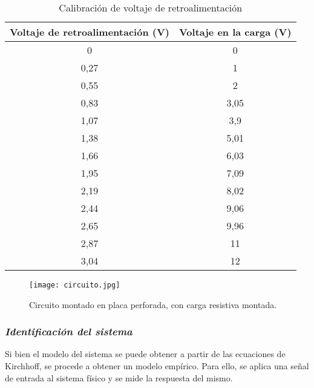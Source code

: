 \begin{table}[H]
    \centering
    \begin{tabular}{|c|c|}
    \hline
    Voltaje de retroalimentación (V) & Voltaje en la carga (V) \\ \hline
    0                                & 0                       \\
    0,27                             & 1                       \\
    0,55                             & 2                       \\
    0,83                             & 3,05                    \\
    1,07                             & 3,9                     \\
    1,38                             & 5,01                    \\
    1,66                             & 6,03                    \\
    1,95                             & 7,09                    \\
    2,19                             & 8,02                    \\
    2,44                             & 9,06                    \\
    2,65                             & 9,96                    \\
    2,87                             & 11                      \\
    3,04                             & 12                      \\ \hline
    \end{tabular}
    \label{tab:calibración_fb}
    \vspace{-0.25cm}
    \caption{Calibración de voltaje de retroalimentación}
\end{table}

\begin{figure}[H]
    \centering
    \texttt{[image: circuito.jpg]}
    \vspace{-0.25cm}
    \caption{Circuito montado en placa perforada, con carga resistiva montada.}
    \label{fig:circuito}
\end{figure}

\subsubsection*{\it{Identificación del sistema}}
\vspace{-0.25cm}
Si bien el modelo del sistema se puede obtener a partir de las ecuaciones de Kirchhoff, se procede
a obtener un modelo empírico. Para ello, se aplica una señal de entrada al sistema físico y se
mide la respuesta del mismo.

